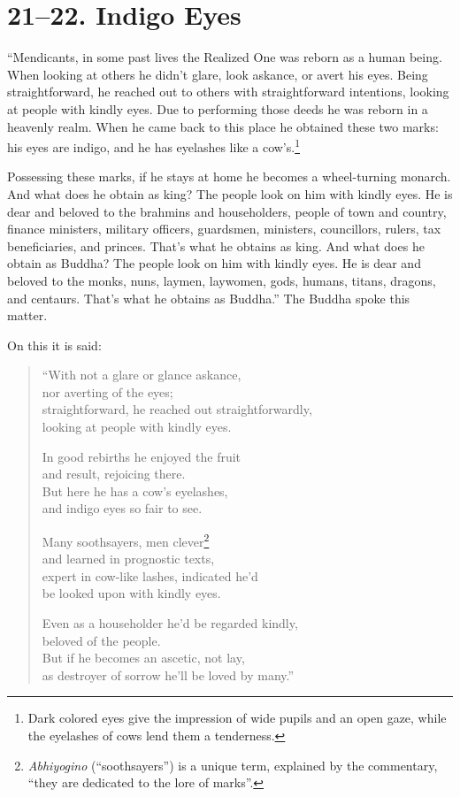 \documentclass[12pt,openany]{book}%
\begin{document}
\section*{21–22. Indigo Eyes }

“Mendicants, in some past lives the Realized One was reborn as a human being. When looking at others he didn’t glare, look askance, or avert his eyes. Being straightforward, he reached out to others with straightforward intentions, looking at people with kindly eyes. Due to performing those deeds he was reborn in a heavenly realm. When he came back to this place he obtained these two marks: his eyes are indigo, and he has eyelashes like a cow’s.\footnote{Dark colored eyes give the impression of wide pupils and an open gaze, while the eyelashes of cows lend them a tenderness. } 

Possessing these marks, if he stays at home he becomes a wheel-turning monarch. And what does he obtain as king? The people look on him with kindly eyes. He is dear and beloved to the brahmins and householders, people of town and country, finance ministers, military officers, guardsmen, ministers, councillors, rulers, tax beneficiaries, and princes. That’s what he obtains as king. And what does he obtain as Buddha? The people look on him with kindly eyes. He is dear and beloved to the monks, nuns, laymen, laywomen, gods, humans, titans, dragons, and centaurs. That’s what he obtains as Buddha.” The Buddha spoke this matter. 

On this it is said: 

\begin{verse}%
“With not a glare or glance askance, \\
nor averting of the eyes; \\
straightforward, he reached out straightforwardly, \\
looking at people with kindly eyes. 

In good rebirths he enjoyed the fruit \\
and result, rejoicing there. \\
But here he has a cow’s eyelashes, \\
and indigo eyes so fair to see. 

Many soothsayers, men clever\footnote{\textit{Abhiyogino} (“soothsayers”) is a unique term, explained by the commentary, “they are dedicated to the lore of marks”. } \\
and learned in prognostic texts, \\
expert in cow-like lashes, indicated he’d \\
be looked upon with kindly eyes. 

Even as a householder he’d be regarded kindly, \\
beloved of the people. \\
But if he becomes an ascetic, not lay, \\
as destroyer of sorrow he’ll be loved by many.” 

%
\end{verse}
\end{document}
